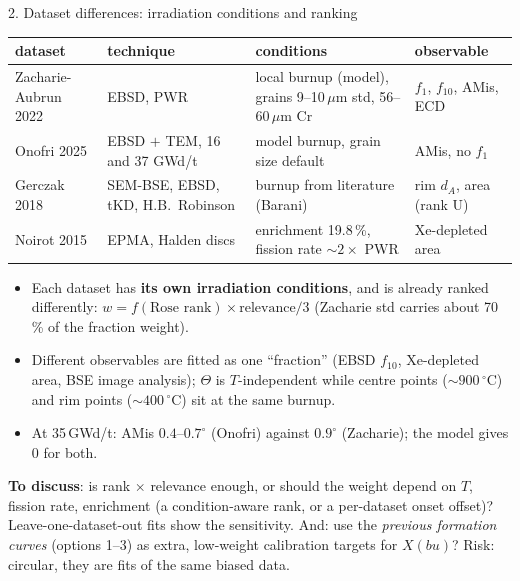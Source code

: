 \documentclass[10pt,aspectratio=169]{beamer}
\begin{document}
\begin{frame}{2. Dataset differences: irradiation conditions and ranking}
  \scriptsize
  \begin{tabular}{p{}p{}p{}p{}}
    \toprule
    dataset & technique & conditions & observable \\
    \midrule
    Zacharie-Aubrun 2022 & EBSD, PWR & local burnup (model), grains 9--10\,$\mu$m std, 56--60\,$\mu$m Cr & $f_1$, $f_{10}$, AMis, ECD \\
    Onofri 2025 & EBSD $+$ TEM, 16 and 37 GWd/t & model burnup, grain size default & AMis, no $f_1$ \\
    Gerczak 2018 & SEM-BSE, EBSD, tKD, H.B.\ Robinson & burnup from literature (Barani) & rim $d_A$, area (rank U) \\
    Noirot 2015 & EPMA, Halden discs & enrichment 19.8\,\%, fission rate $\sim2\times$ PWR & Xe-depleted area \\
    \bottomrule
  \end{tabular}

  \vspace{0.4em}
  \footnotesize
  \begin{itemize}
    \item Each dataset has \textbf{its own irradiation conditions}, and is already ranked
      differently: $w = f(\text{Rose rank})\times\text{relevance}/3$ (Zacharie std carries about 70\,\% of the fraction weight).
    \item Different observables are fitted as one ``fraction'' (EBSD $f_{10}$, Xe-depleted area,
      BSE image analysis); $\Theta$ is $T$-independent while centre points ($\sim 900\,^\circ$C) and
      rim points ($\sim 400\,^\circ$C) sit at the same burnup.
    \item At 35\,GWd/t: AMis $0.4$--$0.7^\circ$ (Onofri) against $0.9^\circ$ (Zacharie); the model gives 0 for both.
  \end{itemize}
  \textbf{To discuss}: is rank $\times$ relevance enough, or should the weight depend on
  $T$, fission rate, enrichment (a condition-aware rank, or a per-dataset onset offset)?
  Leave-one-dataset-out fits show the sensitivity. And: use the \emph{previous formation curves}
  (options 1--3) as extra, low-weight calibration targets for $X(bu)$? Risk: circular, they are
  fits of the same biased data.
\end{frame}
\end{document}
